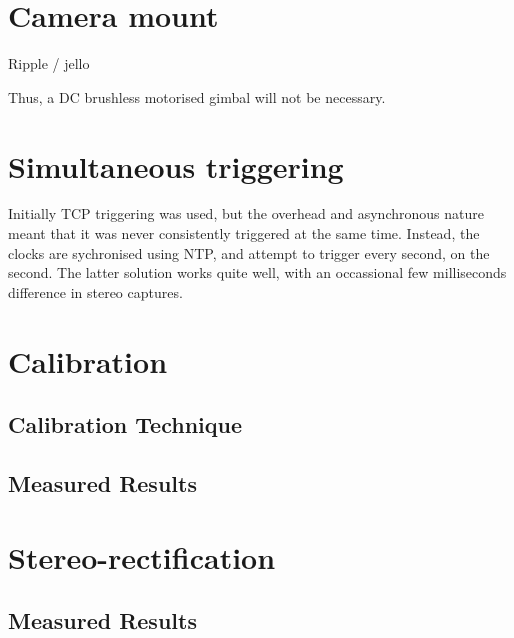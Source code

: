 \section{Camera mount}

Ripple / jello

Thus, a DC brushless motorised gimbal will not be necessary.

\section{Simultaneous triggering}

Initially TCP triggering was used, but the overhead and asynchronous nature meant that it was never consistently triggered at the same time. Instead, the clocks are sychronised using NTP, and attempt to trigger every second, on the second. The latter solution works quite well, with an occassional few milliseconds difference in stereo captures.

\section{Calibration}

\subsection{Calibration Technique}

\subsection{Measured Results}

\section{Stereo-rectification}

\subsection{Measured Results}
